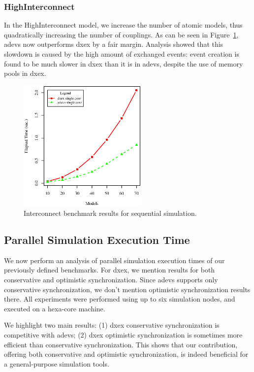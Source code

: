 \subsubsection{HighInterconnect}
In the HighInterconnect model, we increase the number of atomic models, thus quadratically increasing the number of couplings.
As can be seen in Figure~\ref{fig:Interconnect_benchmark}, adevs now outperforms dxex by a fair margin.
Analysis showed that this slowdown is caused by the high amount of exchanged events: event creation is found to be much slower in dxex than it is in adevs, despite the use of memory pools in dxex.

\begin{figure}
	\includegraphics[width=\columnwidth,height=6.5cm]{fig/interconnect_sequential.eps}
	\caption{Interconnect benchmark results for sequential simulation.}
	\label{fig:Interconnect_benchmark}
\end{figure}

\subsection{Parallel Simulation Execution Time}
We now perform an analysis of parallel simulation execution times of our previously defined benchmarks.
For dxex, we mention results for both conservative and optimistic synchronization.
Since adevs supports only conservative synchronization, we don't mention optimistic synchronization results there.
All experiments were performed using up to six simulation nodes, and executed on a hexa-core machine.

We highlight two main results:
(1) dxex conservative synchronization is competitive with adevs;
(2) dxex optimistic synchronization is sometimes more efficient than conservative synchronization.
This shows that our contribution, offering both conservative and optimistic synchronization, is indeed beneficial for a general-purpose simulation tools.

